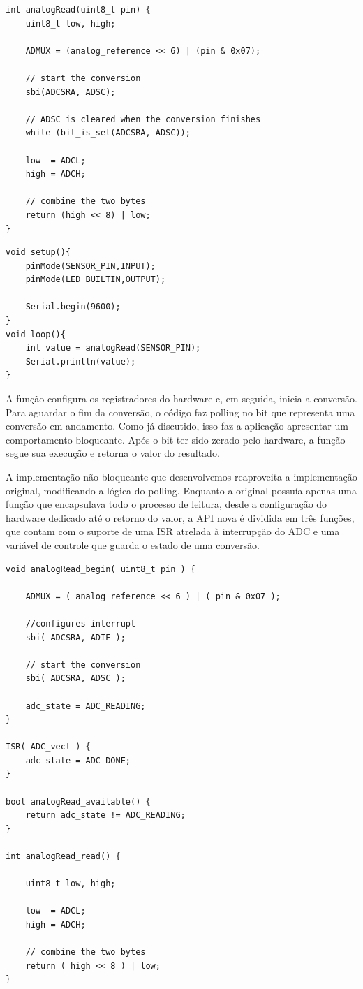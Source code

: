 \documentclass[11pt]{article}
\begin{document}
\begin{lstlisting}[style=CStyle,label=analogblock,caption=Leitura analógica bloqueante]
int analogRead(uint8_t pin) {
	uint8_t low, high;

	ADMUX = (analog_reference << 6) | (pin & 0x07);

	// start the conversion
	sbi(ADCSRA, ADSC);

	// ADSC is cleared when the conversion finishes
	while (bit_is_set(ADCSRA, ADSC));

	low  = ADCL;
	high = ADCH;

	// combine the two bytes
	return (high << 8) | low;
}
\end{lstlisting}
\begin{lstlisting}[style=CStyle,label=analogblockapp,caption=Aplicação utilizando driver bloqueante]
void setup(){
    pinMode(SENSOR_PIN,INPUT);
    pinMode(LED_BUILTIN,OUTPUT);

    Serial.begin(9600);
}
void loop(){
    int value = analogRead(SENSOR_PIN);
    Serial.println(value);
}
\end{lstlisting}
\par A função configura os registradores do hardware e, em seguida, inicia a conversão. Para aguardar o fim da conversão, o código faz polling no bit que representa uma conversão em andamento. Como já discutido, isso faz a aplicação apresentar um comportamento bloqueante. Após o bit ter sido zerado pelo hardware, a função segue sua execução e retorna o valor do resultado. 
\par A implementação não-bloqueante que desenvolvemos reaproveita a implementação original, modificando a lógica do polling. Enquanto a original possuía apenas uma função que encapsulava todo o processo de leitura, desde a configuração do hardware dedicado até o retorno do valor, a API nova é dividida em três funções, que contam com o suporte de uma ISR atrelada à interrupção do ADC e uma variável de controle que guarda o estado de uma conversão.
\begin{lstlisting}[style=CStyle,label=analognonblock,caption=Leitura analógica não-bloqueante]
void analogRead_begin( uint8_t pin ) {

	ADMUX = ( analog_reference << 6 ) | ( pin & 0x07 );

	//configures interrupt
	sbi( ADCSRA, ADIE );

	// start the conversion
	sbi( ADCSRA, ADSC );

	adc_state = ADC_READING;
}

ISR( ADC_vect ) {
	adc_state = ADC_DONE;
}

bool analogRead_available() {
	return adc_state != ADC_READING;
}

int analogRead_read() {

	uint8_t low, high;

	low  = ADCL;
	high = ADCH;

	// combine the two bytes
	return ( high << 8 ) | low;
}
\end{lstlisting}
\end{document}

